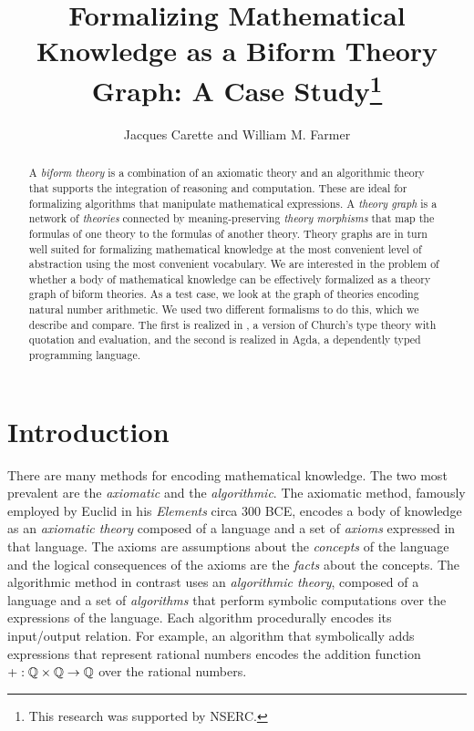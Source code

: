 \documentclass[fleqn]{llncs}
\title{Formalizing Mathematical Knowledge as a Biform Theory Graph: A
  Case Study\thanks{This research was supported by NSERC.}}
\author{Jacques Carette and William M. Farmer}
\institute{%
Computing and Software, McMaster University, Canada\\
\url{http://www.cas.mcmaster.ca/~carette}\\
\url{http://imps.mcmaster.ca/wmfarmer}\\[1.5ex]
\iftoggle{cicm}{}{\today}
}
\begin{document}
\maketitle

\begin{abstract}
A \emph{biform theory} is a combination of an axiomatic theory and an
algorithmic theory that supports the integration of reasoning and
computation.  These are ideal for formalizing algorithms that
manipulate mathematical expressions.  A \emph{theory graph} is a
network of \emph{theories} connected by meaning-preserving
\emph{theory morphisms} that map the formulas of one theory to the
formulas of another theory.  Theory graphs are in turn well suited for
formalizing mathematical knowledge at the most convenient level of
abstraction using the most convenient vocabulary.  We are interested
in the problem of whether a body of mathematical knowledge can be
effectively formalized as a theory graph of biform theories.  As a
test case, we look at the graph of theories encoding natural number
arithmetic.  We used two different formalisms to do this, which we
describe and compare.  The first is realized in {\churchuqe}, a
version of Church's type theory with quotation and evaluation, and the
second is realized in Agda, a dependently typed programming language.
\end{abstract}

\iffalse 

\textbf{Keywords:} Axiomatic mathematics, algorithmic mathematics,
biform theories, theory graphs, symbolic computation, reasoning about
syntax.

\fi

\section{Introduction}\label{sec:introduction}

There are many methods for encoding mathematical knowledge.  The two
most prevalent are the \emph{axiomatic} and the \emph{algorithmic}.
The axiomatic method, famously employed by Euclid in his
\emph{Elements} circa 300 BCE, encodes a body of knowledge as an
\emph{axiomatic theory} composed of a language and a set of
\emph{axioms} expressed in that language.  The axioms are assumptions
about the \emph{concepts} of the language and the logical consequences
of the axioms are the \emph{facts} about the concepts.  The
algorithmic method in contrast uses an \emph{algorithmic theory},
composed of a language and a set of \emph{algorithms} that perform
symbolic computations over the expressions of the language.  Each
algorithm procedurally encodes its input/output relation.  For
example, an algorithm that symbolically adds expressions that
represent rational numbers encodes the addition function $+ :
\mathbb{Q} \times \mathbb{Q} \rightarrow \mathbb{Q}$ over the rational
numbers.
\end{document}
